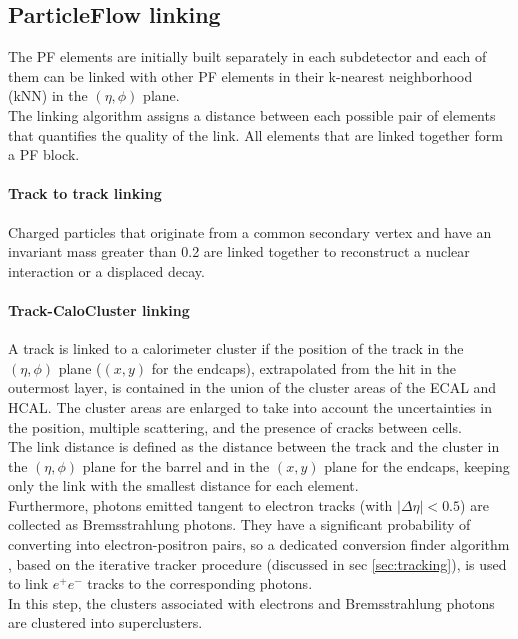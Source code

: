 \subsection{ParticleFlow linking}
The PF elements are initially built separately in each subdetector and each of them can be linked with other PF elements in their k-nearest neighborhood \cite{Dasarathy1991NearestTechniques} (kNN) in the $(\eta,\phi)$ plane.\\
The linking algorithm assigns a distance between each possible pair of elements that quantifies the quality of the link. All elements that are linked together form a PF block.

\paragraph*{Track to track linking}
Charged particles that originate from a common secondary vertex and have an invariant mass greater than 0.2 \GeV are linked together to reconstruct a nuclear interaction or a displaced decay.

\paragraph*{Track-CaloCluster linking}
A track is linked to a calorimeter cluster if the position of the track in the $(\eta,\phi)$ plane ($(x,y)$ for the endcaps), extrapolated from the hit in the outermost layer, is contained in the union of the cluster areas of the ECAL and HCAL. The cluster areas are enlarged to take into account the uncertainties in the position, multiple scattering, and the presence of cracks between cells.\\
The link distance is defined as the distance between the track and the cluster in the $(\eta,\phi)$ plane for the barrel and in the $(x,y)$ plane for the endcaps, keeping only the link with the smallest distance for each element.\\
Furthermore, photons emitted tangent to electron tracks (with $|\Delta \eta| <0.5$) are collected as Bremsstrahlung photons. They have a significant probability of converting into electron-positron pairs, so a dedicated conversion finder algorithm \cite{Sirunyan2021ElectronLHC}, based on the iterative tracker procedure (discussed in sec \ref{sec:tracking}), is used to link $e^+e^-$ tracks to the corresponding photons.\\
In this step, the clusters associated with electrons and Bremsstrahlung photons are clustered into superclusters.



